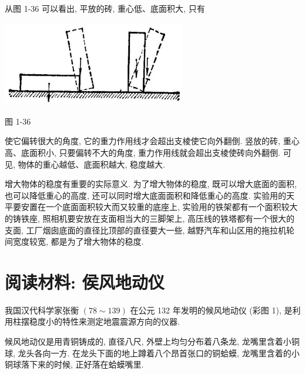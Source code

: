 \documentclass[10pt]{article}
\begin{document}
从图 1-36 可以看出, 平放的砖, 重心低、底面积大, 只有

\begin{center}
\includegraphics[max width=0.6\textwidth]{images/01912d55-147c-70aa-b0e0-1782a122f948_48_300670.jpg}
\end{center}

图 1-36

使它偏转很大的角度, 它的重力作用线才会超出支棱使它向外翻倒. 竖放的砖, 重心高、底面积小, 只要偏转不大的角度, 重力作用线就会超出支棱使砖向外翻倒. 可见, 物体的重心越低、底面积越大, 稳度越大.

增大物体的稳度有重要的实际意义. 为了增大物体的稳度, 既可以增大底面的面积, 也可以降低重心的高度, 还可以同时增大底面面积和降低重心的高度. 实验用的天平要安置在一个底面面积较大而又较重的底座上, 实验用的铁架都有一个面积较大的铸铁座, 照相机要安放在支面相当大的三脚架上, 高压线的铁塔都有一个很大的支面, 工厂烟囱底面的直径比顶部的直径要大一些, 越野汽车和山区用的拖拉机轮间宽度较宽, 都是为了增大物体的稳度.

\section*{阅读材料: 侯风地动仪}

我国汉代科学家张衡 \(\left( {{78} \sim {139}}\right)\) 在公元 132 年发明的候风地动仪 (彩图 1), 是利用柱摆稳度小的特性来测定地震震源方向的仪器.

候风地动仪是用青铜铸成的, 直径八尺, 外壁上均匀分布着八条龙, 龙嘴里含着小铜球, 龙头各向一方. 在龙头下面的地上蹲着八个昂首张口的铜蛤蟆, 龙嘴里含着的小铜球落下来的时候, 正好落在蛤蟆嘴里.
\end{document}
